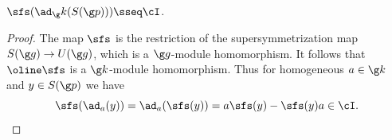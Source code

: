 \documentclass[11pt]{amsart}
\begin{document}
\begin{lem}\label{kS(p)inI}
$\sfs(\ad_\g k(S(\g p)))\sseq\cI$.
\end{lem}
\begin{proof}
The map $\sfs$ is the restriction of the supersymmetrization map $ S(\g g)\to U(\g g)$, which is a $\g g$-module homomorphism. It follows that $\oline\sfs$ is a $\g k$-module homomorphism. Thus for homogeneous $a\in\g k$ and $y\in  S(\g p)$ we have 
\[
\sfs(\ad_a(y))=\ad_a( \sfs(y))=a\sfs(y)-\sfs(y)a\in\cI.
\qedhere\]
\end{proof}
\end{document}
